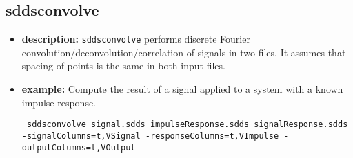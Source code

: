 \newpage
\subsection{sddsconvolve}
\label{sddsconvolve}

\begin{itemize}
\item {\bf description:} 
{\tt sddsconvolve} performs discrete Fourier convolution/deconvolution/correlation of
signals in two files.  It assumes that spacing of points is the same in both input files.
\item {\bf example:}
Compute the result of a signal applied to a system with a known impulse response.
\begin{flushleft}{\tt
sddsconvolve signal.sdds impulseResponse.sdds signalResponse.sdds
-signalColumns=t,VSignal -responseColumns=t,VImpulse -outputColumns=t,VOutput
}\end{flushleft}


\end{itemize}
